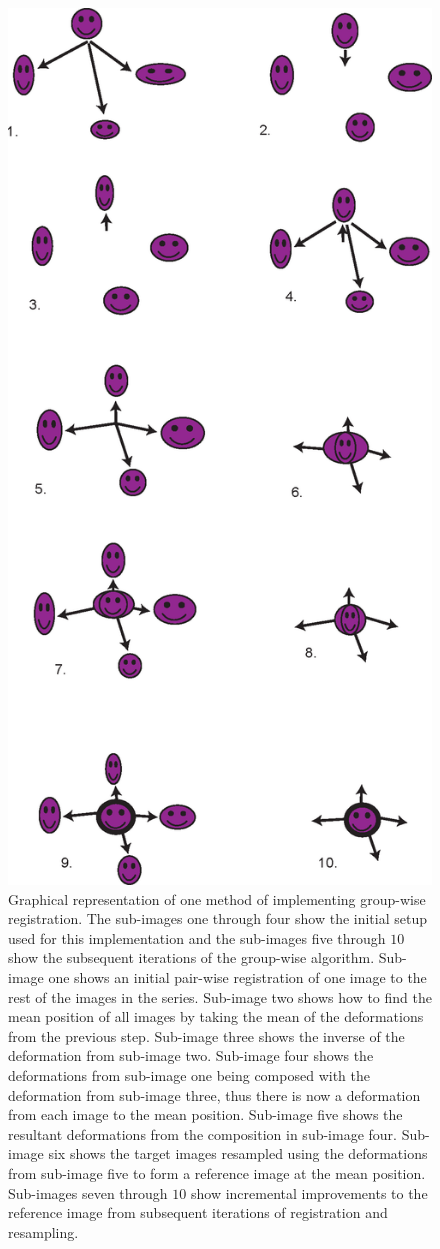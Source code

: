             \begin{figure}
                \centering
                        
                \includegraphics[width=0.4\linewidth]{figures/background_applying_image_registration_groupwise_breakdown.png}
                        
                \captionsetup{singlelinecheck=false}
                \caption{
                    Graphical representation of one method of implementing group-wise registration. The sub-images one through four show the initial setup used for this implementation and the sub-images five through $10$ show the subsequent iterations of the group-wise algorithm. Sub-image one shows an initial pair-wise registration of one image to the rest of the images in the series. Sub-image two shows how to find the mean position of all images by taking the mean of the deformations from the previous step. Sub-image three shows the inverse of the deformation from sub-image two. Sub-image four shows the deformations from sub-image one being composed with the deformation from sub-image three, thus there is now a deformation from each image to the mean position. Sub-image five shows the resultant deformations from the composition in sub-image four. Sub-image six shows the target images resampled using the deformations from sub-image five to form a reference image at the mean position. Sub-images seven through $10$ show incremental improvements to the reference image from subsequent iterations of registration and resampling.
                }
                \label{fig:applying_image_registration_group-wise_breakdown}
            \end{figure}
            
